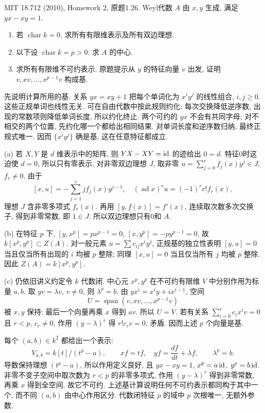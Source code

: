 \begin{exercise}\label{hw:1.26}
MIT 18.712 (2010), Homework 2, 原题1.26. Weyl代数 $A$ 由 $x,y$ 生成, 满足 $yx-xy=1$.
\begin{enumerate}[label=(\alph*)]
\item 若 $\operatorname{char}k=0$, 求所有有限维表示及所有双边理想.
\item 以下设 $\operatorname{char}k=p>0$. 求 $A$ 的中心.
\item 求所有有限维不可约表示. 原题提示从 $y$ 的特征向量 $v$ 出发, 证明 $v,xv,\ldots,x^{p-1}v$ 构成基.
\end{enumerate}
\end{exercise}
\begin{solution}
先说明计算所用的基. 关系 $yx=xy+1$ 把每个单词化为 $x^iy^j$ 的线性组合, $i,j\ge0$. 这些正规单词也线性无关. 可在自由代数中按此规则约化: 每次交换降低逆序数, 出现的常数项则降低单词长度, 所以约化终止. 两个可约的 $yx$ 不会有共同字母; 对不相交的两个位置, 先约化哪一个都给出相同结果. 对单词长度和逆序数归纳, 最终正规式唯一. 因而 $\{x^iy^j\}$ 确是基, 这在任意特征都成立.

(a) 若 $X,Y$ 是 $d$ 维表示中的矩阵, 则 $YX-XY=\operatorname{id}$ 的迹给出 $0=d$. 特征0时这迫使 $d=0$, 所以只有零表示. 对非零双边理想 $J$, 取非零 $u=\sum_{j=0}^r f_j(x)y^j\in J$, $f_r\ne0$. 由于
\[
[x,u]=-\sum_{j=1}^r j f_j(x)y^{j-1},
\quad (\operatorname{ad}x)^r u=(-1)^rr!f_r(x),
\]
理想 $J$ 含非零多项式 $f_r(x)$. 再用 $[y,f(x)]=f'(x)$, 连续取次数多次交换子, 得到非零常数, 即 $1\in J$. 所以双边理想只有0和 $A$.

(b) 在特征 $p$ 下, $[y,x^p]=p x^{p-1}=0$, $[x,y^p]=-p y^{p-1}=0$, 故 $k[x^p,y^p]\subset Z(A)$. 对一般元素 $u=\sum c_{ij}x^iy^j$, 正规基的独立性表明 $[y,u]=0$ 当且仅当所有出现的 $i$ 均被 $p$ 整除; 同理 $[x,u]=0$ 当且仅当所有 $j$ 均被 $p$ 整除. 因此 $Z(A)=k[x^p,y^p]$.

(c) 仍依旧讲义约定令 $k$ 代数闭. 中心元 $x^p,y^p$ 在不可约有限维 $V$ 中分别作用为标量 $a,b$. 取 $yv=\lambda v$, $v\ne0$, 则 $\lambda^p=b$. 由 $yx^i=x^iy+i x^{i-1}$, 空间
\[
U=\operatorname{span}(v,xv,\ldots,x^{p-1}v)
\]
被 $x,y$ 保持: 最后一个向量再乘 $x$ 得到 $av$. 所以 $U=V$. 若有关系 $\sum_{i=0}^r c_i x^iv=0$ 且 $r<p$, $c_r\ne0$, 作用 $(y-\lambda)^r$ 得 $r!c_rv=0$, 矛盾. 因而上述 $p$ 个向量是基.

每个 $(a,b)\in k^2$ 都给出一个表示:
\[
V_{a,b}=k[t]/(t^p-a),\qquad
x f=t f,\quad y f=\frac{df}{dt}+\lambda f,
\qquad \lambda^p=b.
\]
导数保持理想 $(t^p-a)$, 所以作用定义良好, 且 $yx-xy=1$, $x^p=a\operatorname{id}$, $y^p=b\operatorname{id}$. 非零不变子空间中取次数为 $r<p$ 的非零多项式, 作用 $(y-\lambda)^r$ 得到非零常数, 再乘 $x$ 得到全空间. 故它不可约. 上述基计算说明任何不可约表示都同构于其中一个, 而不同 $(a,b)$ 由中心作用区分. 代数闭特征 $p$ 的域中 $p$ 次根唯一, 无额外参数.
\end{solution}

